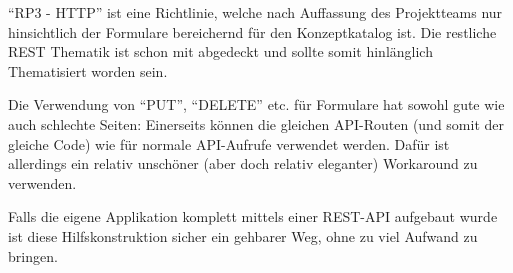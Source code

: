 ``RP3 - HTTP'' ist eine Richtlinie, welche nach Auffassung des Projektteams nur hinsichtlich der Formulare bereichernd für den Konzeptkatalog ist. Die restliche \gls{REST} Thematik ist schon mit  abgedeckt und sollte somit hinlänglich Thematisiert worden sein.

Die Verwendung von ``PUT'', ``DELETE'' etc. für Formulare hat sowohl gute wie auch schlechte Seiten: Einerseits können die gleichen API-Routen (und somit der gleiche Code) wie für normale API-Aufrufe verwendet werden. Dafür ist allerdings ein relativ unschöner (aber doch relativ eleganter) Workaround zu verwenden.

Falls die eigene Applikation komplett mittels einer \gls{REST}-API aufgebaut wurde ist diese Hilfskonstruktion sicher ein gehbarer Weg, ohne zu viel Aufwand zu bringen.